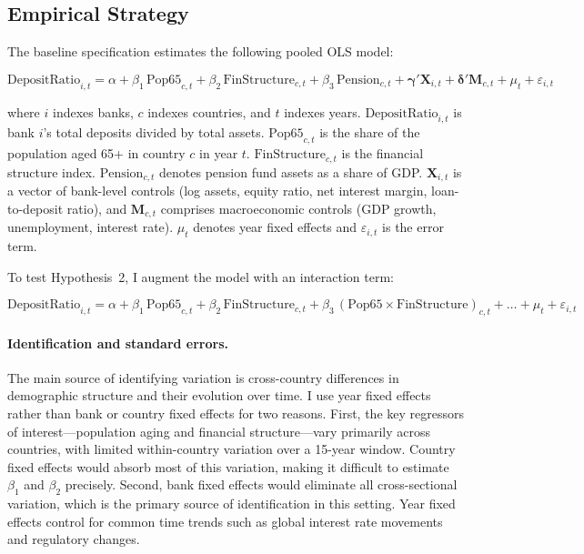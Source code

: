 \documentclass[12pt,a4paper]{article}
\begin{document}
\subsection{Empirical Strategy}

The baseline specification estimates the following pooled OLS model:

\begin{equation}
\label{eq:baseline}
\text{DepositRatio}_{i,t} = \alpha + \beta_1 \, \text{Pop65}_{c,t} + \beta_2 \, \text{FinStructure}_{c,t} + \beta_3 \, \text{Pension}_{c,t} + \boldsymbol{\gamma}' \mathbf{X}_{i,t} + \boldsymbol{\delta}' \mathbf{M}_{c,t} + \mu_t + \varepsilon_{i,t}
\end{equation}

\noindent where $i$ indexes banks, $c$ indexes countries, and $t$ indexes years. $\text{DepositRatio}_{i,t}$ is bank $i$'s total deposits divided by total assets. $\text{Pop65}_{c,t}$ is the share of the population aged 65+ in country $c$ in year $t$. $\text{FinStructure}_{c,t}$ is the financial structure index. $\text{Pension}_{c,t}$ denotes pension fund assets as a share of GDP. $\mathbf{X}_{i,t}$ is a vector of bank-level controls (log assets, equity ratio, net interest margin, loan-to-deposit ratio), and $\mathbf{M}_{c,t}$ comprises macroeconomic controls (GDP growth, unemployment, interest rate). $\mu_t$ denotes year fixed effects and $\varepsilon_{i,t}$ is the error term.

To test Hypothesis~2, I augment the model with an interaction term:

\begin{equation}
\label{eq:interaction}
\text{DepositRatio}_{i,t} = \alpha + \beta_1 \, \text{Pop65}_{c,t} + \beta_2 \, \text{FinStructure}_{c,t} + \beta_3 \, (\text{Pop65} \times \text{FinStructure})_{c,t} + \ldots + \mu_t + \varepsilon_{i,t}
\end{equation}

\paragraph{Identification and standard errors.} The main source of identifying variation is cross-country differences in demographic structure and their evolution over time. I use year fixed effects rather than bank or country fixed effects for two reasons. First, the key regressors of interest---population aging and financial structure---vary primarily across countries, with limited within-country variation over a 15-year window. Country fixed effects would absorb most of this variation, making it difficult to estimate $\beta_1$ and $\beta_2$ precisely. Second, bank fixed effects would eliminate all cross-sectional variation, which is the primary source of identification in this setting. Year fixed effects control for common time trends such as global interest rate movements and regulatory changes.
\end{document}
